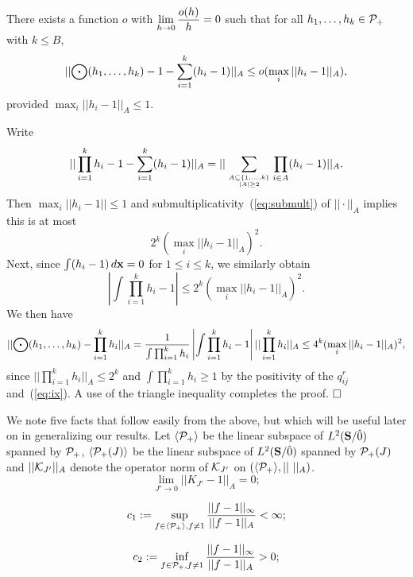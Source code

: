 \begin{lem} \label{lem:taylor}
There exists a function $o$ with $\displaystyle{\lim_{h \to 0} {o(h) \over h} 
= 0}$ such that for all $h_1 , \ldots , h_k \in {\cal P}_+$
with $k \leq B$,
\begin{equation} \label{eq:xi}
|| {\bigodot} (h_1 , \ldots , h_k) - 1 - \sum_{i=1}^k (h_i - 1)||_A
   \leq o(\max_i ||h_i - 1||_A) ,
\end{equation}
provided $\max_i ||h_i - 1||_A\le 1$.
\end{lem}

 Write
\begin{equation} \label{eq:new01}
|| \prod_{i=1}^k h_i - 1 - \sum_{i=1}^k (h_i - 1)||_A = 
|| \sum_{{A\subseteq\{1,\ldots,k\}\atop |A|\ge 2}} \prod_{i\in A}(h_i-1)||_A.
\end{equation}
Then $\max_i ||h_i - 1|| \leq 1$ and
submultiplicativity~(\ref{eq:submult})
of $|| \cdot ||_A$ implies this is at most
$$ 2^k (\max_i ||h_i - 1||_A)^2 .$$
Next, since $\int (h_i - 1) \, d{\bf x} = 0$ for $1 \leq i \leq k$, 
we similarly obtain
$$\left|\int \prod_{i=1}^k h_i - 1\right| \leq 2^k (\max_i ||h_i - 1||_A)^2.$$
We then have
$$
|| {\bigodot} (h_1 , \ldots , h_k) - \prod_{i=1}^k h_i||_A =
{1\over \int \prod_{i=1}^k h_i}\left|\int \prod_{i=1}^k h_i - 1\right|
|| \prod_{i=1}^k h_i ||_A
\leq 4^k (\max_i ||h_i - 1||_A)^2 ,$$
since $|| \prod_{i=1}^k h_i ||_A\le 2^k$ and
$\int \prod_{i=1}^k h_i\ge 1$ by 
the positivity of the $q^r_{ij}$ and~(\ref{eq:ix}).
A use of the triangle inequality completes the proof. $\qed$

We note five facts that follow easily from the above, but
which will be useful later on in generalizing our results.
Let $\langle{\cal P}_+\rangle$ be the linear subspace of $L^2 ({\bf S}/{\hat{0}})$ spanned by ${\cal P}_+$,
$\langle{\cal P}_+(J)\rangle$ be the linear subspace of $L^2 ({\bf S}/{\hat{0}})$ spanned by ${\cal P}_+(J)$
and $|| {\cal K}_{J'} ||_A$ denote the operator norm of ${\cal K}_{J'}$ on
$(\langle{\cal P}_+\rangle,||\,\,||_A)$.
\begin{equation} \label{eq:xii}
\lim_{J' \to 0} ||K_{J'} - 1||_A = 0 ;
\end{equation}

\begin{equation} \label{eq:present iii}
c_1:=\sup_{f\in\langle{\cal P}_+\rangle ,f \neq 1} {||f - 1||_\infty \over ||f - 1||_A} < \infty ;
\end{equation}

\begin{equation} \label{eq:present iii'}
c_2:=\inf_{f\in{\cal P}_+,f\neq 1} {||f - 1||_\infty \over ||f - 1||_A} > 0 ;
\end{equation}

